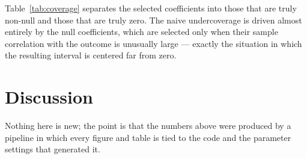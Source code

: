 Table~\ref{tab:coverage} separates the selected coefficients into those that are
truly non-null and those that are truly zero. The naive undercoverage is driven
almost entirely by the null coefficients, which are selected only when their
sample correlation with the outcome is unusually large --- exactly the situation
in which the resulting interval is centered far from zero.



\section{Discussion}

Nothing here is new; the point is that the numbers above were produced by a
pipeline in which every figure and table is tied to the code and the parameter
settings that generated it.

